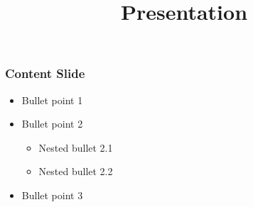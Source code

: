 \documentclass{beamer}
\title{Presentation}
\begin{document}
\begin{frame}
\frametitle{Content Slide}
\begin{itemize}
\item Bullet point 1
\item Bullet point 2
\begin{itemize}
\item Nested bullet 2.1
\item Nested bullet 2.2
\end{itemize}
\item Bullet point 3
\end{itemize}
\end{frame}
\end{document}
